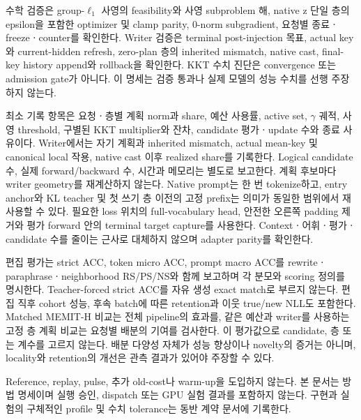 \documentclass[11pt]{article}
\begin{document}
수학 검증은 group-$\ell_1$ 사영의 feasibility와 사영 subproblem 해,
native z 단일 층의 epsilon을 포함한 optimizer 및 clamp parity,
0-norm subgradient, 요청별 종료ㆍfreezeㆍcounter를 확인한다.
Writer 검증은 terminal post-injection 목표, actual key와 current-hidden
refresh, zero-plan 층의 inherited mismatch, native cast, final-key
history append와 rollback을 확인한다. KKT 수치 진단은 convergence
또는 admission gate가 아니다. 이 명세는 검증 통과나 실제 모델의 성능
수치를 선행 주장하지 않는다.

최소 기록 항목은 요청ㆍ층별 계획 norm과 share, 예산 사용률, active set,
$\gamma$ 궤적, 사영 threshold, 구별된 KKT multiplier와 잔차,
candidate 평가ㆍupdate 수와 종료 사유이다. Writer에서는 자기 계획과
inherited mismatch, actual mean-key 및 canonical local 작용,
native cast 이후 realized share를 기록한다. Logical candidate 수,
실제 forward/backward 수, 시간과 메모리는 별도로 보고한다.
계획 후보마다 writer geometry를 재계산하지 않는다. Native prompt는
한 번 tokenize하고, entry anchor와 KL teacher 및 첫 쓰기 층 이전의
고정 prefix는 의미가 동일한 범위에서 재사용할 수 있다. 필요한 loss
위치의 full-vocabulary head, 안전한 오른쪽 padding 제거와 평가
forward 안의 terminal target capture를 사용한다. Contextㆍ어휘ㆍ평가ㆍ
candidate 수를 줄이는 근사로 대체하지 않으며 adapter parity를 확인한다.

편집 평가는 strict ACC, token micro ACC, prompt macro ACC를
rewriteㆍparaphraseㆍneighborhood RS/PS/NS와 함께 보고하며 각 분모와
scoring 정의를 명시한다. Teacher-forced strict ACC를 자유 생성
exact match로 부르지 않는다. 편집 직후 cohort 성능,
후속 batch에 따른 retention과 이웃 true/new NLL도 포함한다.
Matched MEMIT-H 비교는 전체 pipeline의 효과를, 같은 예산과 writer를
사용하는 고정 층 계획 비교는 요청별 배분의 기여를 검사한다.
이 평가값으로 candidate, 층 또는 계수를 고르지 않는다.
배분 다양성 자체가 성능 향상이나 novelty의 증거는 아니며,
locality와 retention의 개선은 관측 결과가 있어야 주장할 수 있다.

Reference, replay, pulse, 추가 old-cost나 warm-up을 도입하지 않는다.
본 문서는 방법 명세이며 실행 승인, dispatch 또는 GPU 실험 결과를
포함하지 않는다. 구현과 실험의 구체적인 profile 및 수치 tolerance는
동반 계약 문서에 기록한다.
\end{document}
